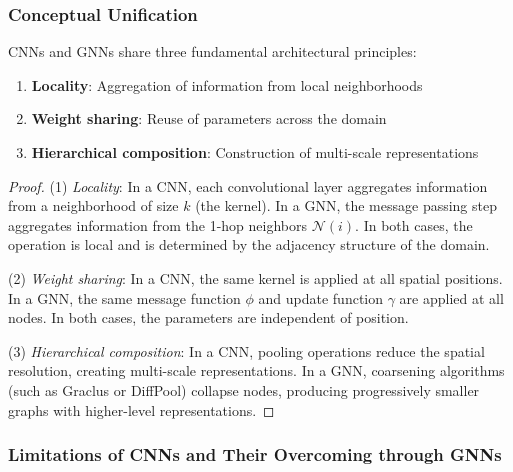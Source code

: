 \subsubsection{Conceptual Unification}

\begin{proposition}\label{prop:principios_compartidos}
\glspl{CNN} and \glspl{GNN} share three fundamental architectural principles:
\begin{enumerate}
    \item \textbf{Locality}: Aggregation of information from local neighborhoods
    \item \textbf{Weight sharing}: Reuse of parameters across the domain
    \item \textbf{Hierarchical composition}: Construction of multi-scale representations
\end{enumerate}
\end{proposition}

\begin{proof}
(1) \textit{Locality}: In a CNN, each convolutional layer aggregates information from a neighborhood of size $k$ (the kernel). In a GNN, the message passing step aggregates information from the 1-hop neighbors $\mathcal{N}(i)$. In both cases, the operation is local and is determined by the adjacency structure of the domain.

(2) \textit{Weight sharing}: In a CNN, the same kernel is applied at all spatial positions. In a GNN, the same message function $\phi$ and update function $\gamma$ are applied at all nodes. In both cases, the parameters are independent of position.

(3) \textit{Hierarchical composition}: In a CNN, pooling operations reduce the spatial resolution, creating multi-scale representations. In a GNN, coarsening algorithms (such as Graclus or DiffPool) collapse nodes, producing progressively smaller graphs with higher-level representations.
\end{proof}

\subsubsection{Limitations of CNNs and Their Overcoming through GNNs}

